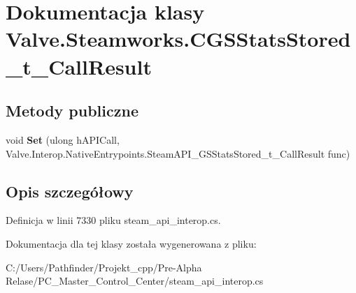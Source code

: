 \hypertarget{class_valve_1_1_steamworks_1_1_c_g_s_stats_stored__t___call_result}{}\section{Dokumentacja klasy Valve.\+Steamworks.\+C\+G\+S\+Stats\+Stored\+\_\+t\+\_\+\+Call\+Result}
\label{class_valve_1_1_steamworks_1_1_c_g_s_stats_stored__t___call_result}
\subsection*{Metody publiczne}
\begin{DoxyCompactItemize}
\item 
\mbox{\label{class_valve_1_1_steamworks_1_1_c_g_s_stats_stored__t___call_result_a9d307e8fd02a545435c3b4a5760ce892}} 
void {\bfseries Set} (ulong h\+A\+P\+I\+Call, Valve.\+Interop.\+Native\+Entrypoints.\+Steam\+A\+P\+I\+\_\+\+G\+S\+Stats\+Stored\+\_\+t\+\_\+\+Call\+Result func)
\end{DoxyCompactItemize}


\subsection{Opis szczegółowy}


Definicja w linii 7330 pliku steam\+\_\+api\+\_\+interop.\+cs.



Dokumentacja dla tej klasy została wygenerowana z pliku\+:\begin{DoxyCompactItemize}
\item 
C\+:/\+Users/\+Pathfinder/\+Projekt\+\_\+cpp/\+Pre-\/\+Alpha Relase/\+P\+C\+\_\+\+Master\+\_\+\+Control\+\_\+\+Center/steam\+\_\+api\+\_\+interop.\+cs\end{DoxyCompactItemize}
